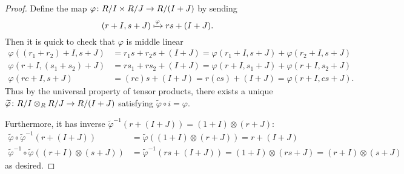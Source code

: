 \documentclass{article}
\begin{document}
\begin{proof}
  Define the map $\varphi \colon R/I \times R/J \rightarrow R/(I + J)$ by sending \[
    (r + I, s + J) \xmapsto{\varphi} rs + (I + J).
  \] Then it is quick to check that $\varphi$ is middle linear \begin{align*}
    \varphi((r_1 + r_2) + I, s + J)
      &= r_1s + r_2s + (I + J)
      = \varphi(r_1 + I, s + J) + \varphi(r_2 + I, s + J) \\
    \varphi(r + I, (s_1 + s_2) + J)
      &= rs_1 + rs_2 + (I + J)
      = \varphi(r + I, s_1 + J) + \varphi(r + I, s_2 + J) \\
    \varphi(rc + I, s + J)
      &= (rc)s + (I + J)
      = r(cs) + (I + J)
      = \varphi(r + I, cs + J).
  \end{align*}
  Thus by the universal property of tensor products, there exists a unique
  $\widetilde\varphi \colon R/I \otimes_R R/J \rightarrow R/(I + J)$ satisfying
  $\widetilde\varphi \circ i = \varphi$.

  Furthermore, it has inverse
  $\widetilde\varphi^{-1}(r + (I + J)) = (1 + I) \otimes (r + J)$: \begin{align*}
    \widetilde\varphi\circ\widetilde\varphi^{-1}(r + (I + J)) &= \widetilde\varphi((1 + I) \otimes (r + J)) = r + (I + J) \\
    \widetilde\varphi^{-1}\circ\widetilde\varphi((r + I) \otimes (s + J)) &= \widetilde\varphi^{-1}(rs + (I + J)) = (1 + I) \otimes (rs + J) = (r + I) \otimes (s + J)
  \end{align*}
  as desired.
\end{proof}
\end{document}
